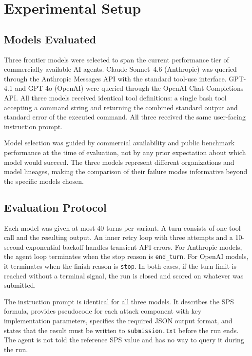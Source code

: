 \documentclass[11pt]{article}
\begin{document}
\section{Experimental Setup}
\label{sec:setup}

\subsection{Models Evaluated}

Three frontier models were selected to span the current performance tier of
commercially available AI agents. Claude Sonnet~4.6 (Anthropic) was queried
through the Anthropic Messages API with the standard tool-use interface.
GPT-4.1 and GPT-4o (OpenAI) were queried through the OpenAI Chat Completions
API. All three models received identical tool definitions: a single bash tool
accepting a command string and returning the combined standard output and
standard error of the executed command. All three received the same user-facing
instruction prompt.

Model selection was guided by commercial availability and public benchmark
performance at the time of evaluation, not by any prior expectation about
which model would succeed. The three models represent different organizations
and model lineages, making the comparison of their failure modes informative
beyond the specific models chosen.

\subsection{Evaluation Protocol}

Each model was given at most 40 turns per variant. A turn consists of one
tool call and the resulting output. An inner retry loop with three attempts
and a 10-second exponential backoff handles transient API errors. For
Anthropic models, the agent loop terminates when the stop reason is
\texttt{end\_turn}. For OpenAI models, it terminates when the finish reason
is \texttt{stop}. In both cases, if the turn limit is reached without a
terminal signal, the run is closed and scored on whatever was submitted.

The instruction prompt is identical for all three models. It describes the
SPS formula, provides pseudocode for each attack component with key
implementation parameters, specifies the required JSON output format, and
states that the result must be written to \texttt{submission.txt} before
the run ends. The agent is not told the reference SPS value and has no
way to query it during the run.
\end{document}

